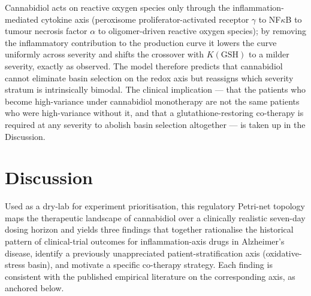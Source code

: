 \documentclass[10pt,letterpaper]{article}
\begin{document}
Cannabidiol acts on reactive oxygen species only through the inflammation-mediated cytokine axis (peroxisome proliferator-activated receptor $\gamma$ to NF$\kappa$B to tumour necrosis factor $\alpha$ to oligomer-driven reactive oxygen species); by removing the inflammatory contribution to the production curve it lowers the curve uniformly across severity and shifts the crossover with $K(\text{GSH})$ to a milder severity, exactly as observed. The model therefore predicts that cannabidiol cannot eliminate basin selection on the redox axis but reassigns which severity stratum is intrinsically bimodal. The clinical implication --- that the patients who become high-variance under cannabidiol monotherapy are not the same patients who were high-variance without it, and that a glutathione-restoring co-therapy is required at any severity to abolish basin selection altogether --- is taken up in the Discussion.

\section{Discussion}
\label{sec:discussion}

Used as a dry-lab for experiment prioritisation, this regulatory Petri-net topology maps the therapeutic landscape of cannabidiol over a clinically realistic seven-day dosing horizon and yields three findings that together rationalise the historical pattern of clinical-trial outcomes for inflammation-axis drugs in Alzheimer's disease, identify a previously unappreciated patient-stratification axis (oxidative-stress basin), and motivate a specific co-therapy strategy. Each finding is consistent with the published empirical literature on the corresponding axis, as anchored below.
\end{document}
